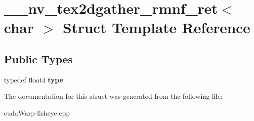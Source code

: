 \hypertarget{struct____nv__tex2dgather__rmnf__ret_3_01char_01_4}{}\section{\+\_\+\+\_\+nv\+\_\+tex2dgather\+\_\+rmnf\+\_\+ret$<$ char $>$ Struct Template Reference}
\label{struct____nv__tex2dgather__rmnf__ret_3_01char_01_4}
\subsection*{Public Types}
\begin{DoxyCompactItemize}
\item 
typedef float4 {\bfseries type}\hypertarget{struct____nv__tex2dgather__rmnf__ret_3_01char_01_4_a4ae2b3c5a6715cd4afa1d1433e4b5630}{}\label{struct____nv__tex2dgather__rmnf__ret_3_01char_01_4_a4ae2b3c5a6715cd4afa1d1433e4b5630}

\end{DoxyCompactItemize}


The documentation for this struct was generated from the following file\+:\begin{DoxyCompactItemize}
\item 
cuda\+Warp-\/fisheye.\+cpp\end{DoxyCompactItemize}
